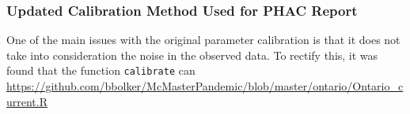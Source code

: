 \documentclass[12pt]{article}\usepackage[]{graphicx}\usepackage[]{color}
\begin{document}

\subsubsection*{Updated Calibration Method Used for PHAC Report}

One of the main issues with the original parameter calibration is that it does not take into consideration the noise in the observed data. To rectify this, it was found that the function \texttt{calibrate} can \url{https://github.com/bbolker/McMasterPandemic/blob/master/ontario/Ontario_current.R}
\end{document}
